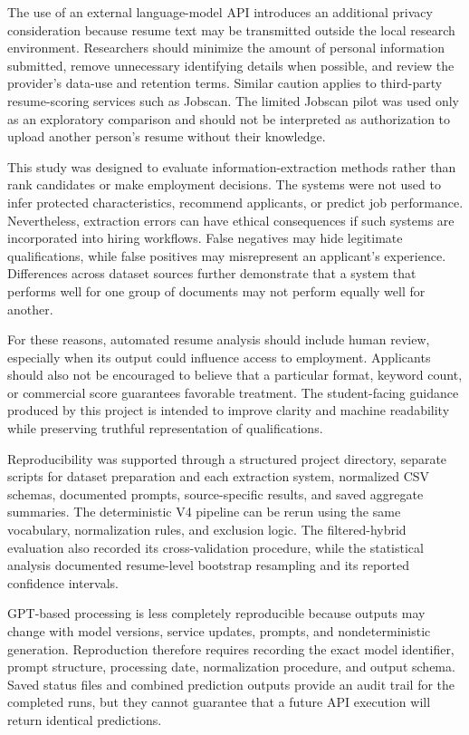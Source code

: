 \documentclass[conference]{IEEEtran}
\begin{document}
The use of an external language-model API introduces an additional
privacy consideration because resume text may be transmitted outside the
local research environment. Researchers should minimize the amount of
personal information submitted, remove unnecessary identifying details
when possible, and review the provider's data-use and retention terms.
Similar caution applies to third-party resume-scoring services such as
Jobscan. The limited Jobscan pilot was used only as an exploratory
comparison and should not be interpreted as authorization to upload
another person's resume without their knowledge.

This study was designed to evaluate information-extraction methods rather
than rank candidates or make employment decisions. The systems were not
used to infer protected characteristics, recommend applicants, or predict
job performance. Nevertheless, extraction errors can have ethical
consequences if such systems are incorporated into hiring workflows.
False negatives may hide legitimate qualifications, while false positives
may misrepresent an applicant's experience. Differences across dataset
sources further demonstrate that a system that performs well for one
group of documents may not perform equally well for another.

For these reasons, automated resume analysis should include human review,
especially when its output could influence access to employment.
Applicants should also not be encouraged to believe that a particular
format, keyword count, or commercial score guarantees favorable
treatment. The student-facing guidance produced by this project is
intended to improve clarity and machine readability while preserving
truthful representation of qualifications.

Reproducibility was supported through a structured project directory,
separate scripts for dataset preparation and each extraction system,
normalized CSV schemas, documented prompts, source-specific results, and
saved aggregate summaries. The deterministic V4 pipeline can be rerun
using the same vocabulary, normalization rules, and exclusion logic.
The filtered-hybrid evaluation also recorded its cross-validation
procedure, while the statistical analysis documented resume-level
bootstrap resampling and its reported confidence intervals.

GPT-based processing is less completely reproducible because outputs may
change with model versions, service updates, prompts, and nondeterministic
generation. Reproduction therefore requires recording the exact model
identifier, prompt structure, processing date, normalization procedure,
and output schema. Saved status files and combined prediction outputs
provide an audit trail for the completed runs, but they cannot guarantee
that a future API execution will return identical predictions.
\end{document}
